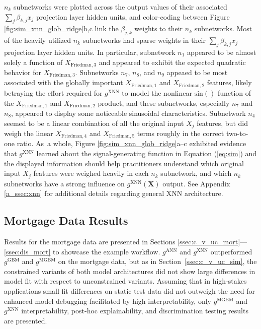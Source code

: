\documentclass[information,article,accept,moreauthors,pdftex]{Definitions/mdpi}
\begin{document}
  $n_k$ subnetworks were plotted across the output values of their associated $\sum_j\beta_{k,j}x_j$ projection layer hidden units, and color-coding between Figure \ref{fig:sim_xnn_glob_ridge}{b},c link the $\beta_{j,k}$ weights to their $n_k$ subnetworks. Most of the heavily utilized $n_k$ subnetworks had sparse weights in their $\sum_j\beta_{k,j}x_j$ projection layer hidden units. In particular, subnetwork $n_1$ appeared to be almost solely a function of $X_{\text{Friedman}, 3}$ and appeared to exhibit the expected quadratic behavior for $X_{\text{Friedman}, 3}$.  Subnetworks $n_7$, $n_8$, and $n_9$ appeaed to be most associated with the globally important $X_{\text{Friedman}, 1}$ and $X_{\text{Friedman}, 2}$ features, likely betraying the effort required for $g^{\text{XNN}}$ to model the nonlinear $\text{sin}()$ function of the $X_{\text{Friedman}, 1}$ and $X_{\text{Friedman}, 2}$ product, and these subnetworks, especially $n_7$ and $n_8$, appeared to display some noticeable sinusoidal characteristics. Subnetwork $n_4$ seemed to be a linear combination of all the original input $X_j$ features, but did weigh the linear $X_{\text{Friedman},4}$ and $X_{\text{Friedman},5}$ terms roughly in the correct two-to-one ratio. As~a whole, Figure \ref{fig:sim_xnn_glob_ridge}a--c exhibited evidence that $g^\text{XNN}$ learned about the signal-generating function in Equation (\ref{eq:sim}) and the displayed information should help practitioners understand which original input $X_j$ features were weighed heavily in each $n_k$ subnetwork, and which $n_k$ subnetworks have a strong influence on $g^\text{XNN}(\mathbf{X})$ output. See Appendix \ref{a_ssec:xnn} for additional details regarding general XNN architecture.

\subsection{Mortgage Data Results}

Results for the mortgage data are presented in Sections \ref{ssec:c_v_uc_mort}---\ref{ssec:dis_mort} to showcase the example workflow.  $g^\text{ANN}$ and $g^\text{XNN}$ outperformed $g^\text{GBM}$ and $g^\text{MGBM}$ on the mortgage data, but as in Section~\ref{ssec:c_v_uc_sim}, the constrained variants of both model architectures did not show large differences in model fit with respect to unconstrained variants. Assuming that in high-stakes applications small fit differences on static test data did not outweigh the need for enhanced model debugging facilitated by high interpretability, only $g^\text{MGBM}$ and $g^\text{XNN}$ interpretability, post-hoc explainability, and discrimination testing results are presented. 
\end{document}
